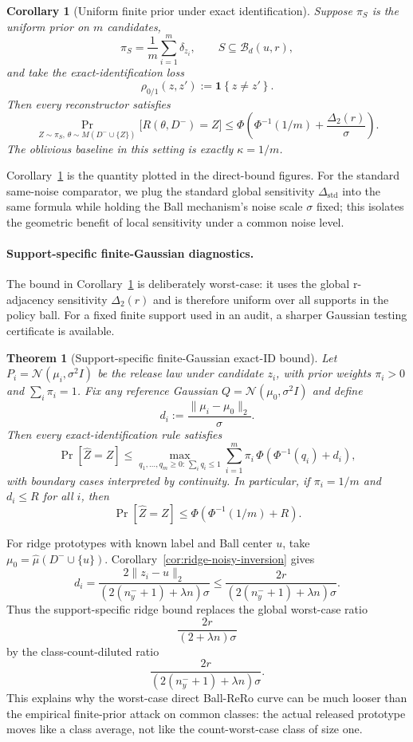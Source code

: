 \documentclass[conference,compsoc]{IEEEtran}
\newtheorem{theorem}{Theorem}
\newtheorem{corollary}{Corollary}
\newcommand{\ind}[1]{\mathbf{1}\!\left\{#1\right\}}
\newcommand{\ball}[2]{\mathcal{B}_{#1}(#2)}
\begin{document}
\begin{corollary}[Uniform finite prior under exact identification]
\label{cor:uniform-finite-prior}
Suppose $\pi_S$ is the uniform prior on $m$ candidates,
\[
\pi_S=\frac{1}{m}\sum_{i=1}^m \delta_{z_i},
\qquad
S\subseteq \ball{d}{u,r},
\]
and take the exact-identification loss
\[
\rho_{0/1}(z,z'):=\ind{z\neq z'}.
\]
Then every reconstructor satisfies
\[
\Pr_{Z\sim\pi_S,\,\theta\sim M(D^-\cup\{Z\})}
\big[R(\theta,D^-)=Z\big]
\le
\Phi\!\left(
\Phi^{-1}(1/m)+\frac{\Delta_2(r)}{\sigma}
\right).
\]
The oblivious baseline in this setting is exactly $\kappa=1/m$.
\end{corollary}

Corollary~\ref{cor:uniform-finite-prior} is the quantity plotted in the direct-bound figures. For the standard same-noise comparator, we plug the standard global sensitivity $\Delta_{\mathrm{std}}$ into the same formula while holding the Ball mechanism's noise scale $\sigma$ fixed; this isolates the geometric benefit of local sensitivity under a common noise level.


\paragraph{Support-specific finite-Gaussian diagnostics.}
The bound in Corollary~\ref{cor:uniform-finite-prior} is deliberately worst-case: it uses the global r-adjacency sensitivity $\Delta_2(r)$ and is therefore uniform over all supports in the policy ball. For a fixed finite support used in an audit, a sharper Gaussian testing certificate is available.

\begin{theorem}[Support-specific finite-Gaussian exact-ID bound]
\label{thm:finite-gaussian-support-bound}
Let $P_i=\mathcal N(\mu_i,\sigma^2 I)$ be the release law under candidate $z_i$, with prior weights $\pi_i>0$ and $\sum_i\pi_i=1$. Fix any reference Gaussian $Q=\mathcal N(\mu_0,\sigma^2 I)$ and define
\[
d_i:=\frac{\|\mu_i-\mu_0\|_2}{\sigma}.
\]
Then every exact-identification rule satisfies
\[
\Pr[\widehat Z=Z]
\le
\max_{q_1,\ldots,q_m\ge 0:\,\sum_i q_i\le 1}
\sum_{i=1}^m
\pi_i\,\Phi\!\left(\Phi^{-1}(q_i)+d_i\right),
\]
with boundary cases interpreted by continuity. In particular, if $\pi_i=1/m$ and $d_i\le R$ for all $i$, then
\[
\Pr[\widehat Z=Z]
\le
\Phi\!\left(\Phi^{-1}(1/m)+R\right).
\]
\end{theorem}

For ridge prototypes with known label and Ball center $u$, take $\mu_0=\widehat\mu(D^-\cup\{u\})$. Corollary~\ref{cor:ridge-noisy-inversion} gives
\[
d_i
=\frac{2\|z_i-u\|_2}{(2(n_y^-+1)+\lambda n)\sigma}
\le
\frac{2r}{(2(n_y^-+1)+\lambda n)\sigma}.
\]
Thus the support-specific ridge bound replaces the global worst-case ratio
\[
\frac{2r}{(2+\lambda n)\sigma}
\]
by the class-count-diluted ratio
\[
\frac{2r}{(2(n_y^-+1)+\lambda n)\sigma}.
\]
This explains why the worst-case direct Ball-ReRo curve can be much looser than the empirical finite-prior attack on common classes: the actual released prototype moves like a class average, not like the count-worst-case class of size one.
\end{document}
